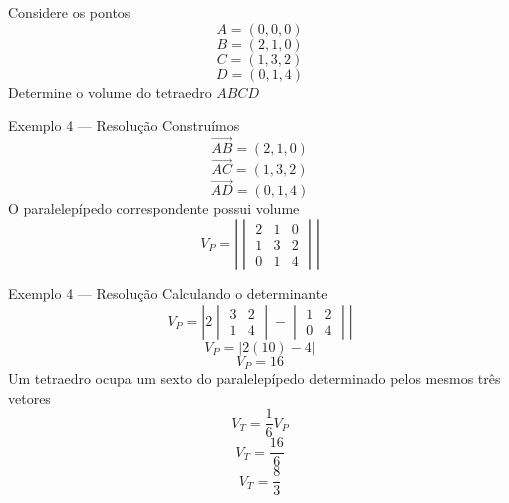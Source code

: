 \begin{question}
  Considere os pontos
  \[
  A=(0,0,0)
  \]
  \[
  B=(2,1,0)
  \]
  \[
  C=(1,3,2)
  \]
  \[
  D=(0,1,4)
  \]
  Determine o volume do tetraedro $ABCD$
\end{question}

\begin{resolution}{Exemplo 4 — Resolução}
Construímos
\[
\overrightarrow{AB}=(2,1,0)
\]
\[
\overrightarrow{AC}=(1,3,2)
\]
\[
\overrightarrow{AD}=(0,1,4)
\]
O paralelepípedo correspondente possui volume
\[
V_P=
\left|
\begin{vmatrix}
2&1&0\\
1&3&2\\
0&1&4
\end{vmatrix}
\right|
\]
\end{resolution}

\begin{resolution}{Exemplo 4 — Resolução}
Calculando o determinante
\[
V_P=
\left|
2
\begin{vmatrix}
3&2\\
1&4
\end{vmatrix}
-
\begin{vmatrix}
1&2\\
0&4
\end{vmatrix}
\right|
\]
\[
V_P=|2(10)-4|
\]
\[
V_P=16
\]
Um tetraedro ocupa um sexto do paralelepípedo determinado pelos mesmos três vetores
\[
V_T=\frac16V_P
\]
\[
V_T=\frac{16}{6}
\]
\[
V_T=\frac83
\]
\end{resolution}
